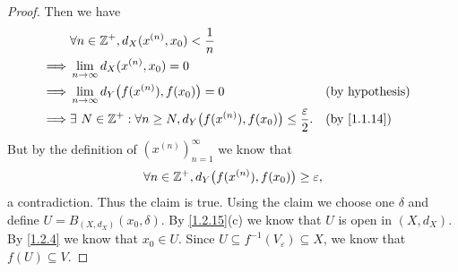 \begin{proof}
  Then we have
  \begin{align*}
             & \forall n \in \Z^+, d_X(x^{(n)}, x_0) < \dfrac{1}{n}                                                                                \\
    \implies & \lim_{n \to \infty} d_X(x^{(n)}, x_0) = 0                                                                                           \\
    \implies & \lim_{n \to \infty} d_Y\big(f(x^{(n)}), f(x_0)\big) = 0                                              &  & \text{(by hypothesis)}    \\
    \implies & \exists\ N \in \Z^+ : \forall n \geq N, d_Y\big(f(x^{(n)}), f(x_0)\big) \leq \dfrac{\varepsilon}{2}. &  & \text{(by \cref{1.1.14})}
  \end{align*}
  But by the definition of \((x^{(n)})_{n = 1}^\infty\) we know that
  \[
    \forall n \in \mathbb{Z}^+, d_Y\big(f(x^{(n)}), f(x_0)\big) \geq \varepsilon,
  \]
  a contradiction.
  Thus the claim is true.
  Using the claim we choose one \(\delta\) and define \(U = B_{(X, d_X)}(x_0, \delta)\).
  By \cref{1.2.15}(c) we know that \(U\) is open in \((X, d_X)\).
  By \cref{1.2.4} we know that \(x_0 \in U\).
  Since \(U \subseteq f^{-1}(V_\varepsilon) \subseteq X\), we know that \(f(U) \subseteq V\).


\end{proof}

